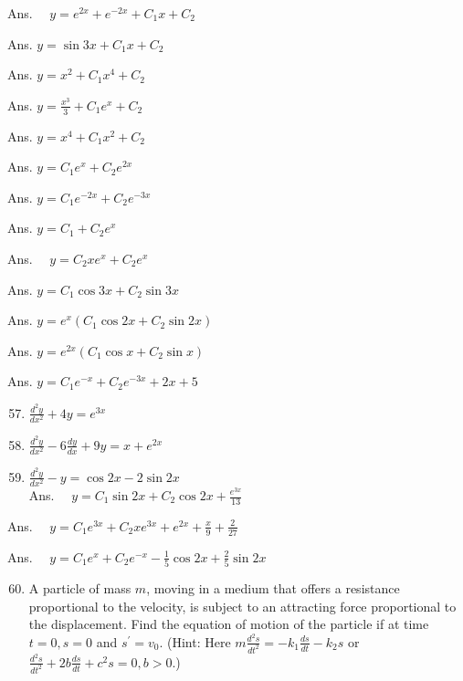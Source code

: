 \documentclass[10pt]{article}
\begin{document}
Ans. $\quad y=e^{2 x}+e^{-2 x}+C_{1} x+C_{2}$

Ans. $y=\sin 3 x+C_{1} x+C_{2}$

Ans. $y=x^{2}+C_{1} x^{4}+C_{2}$

Ans. $y=\frac{x^{3}}{3}+C_{1} e^{x}+C_{2}$

Ans. $y=x^{4}+C_{1} x^{2}+C_{2}$

Ans. $y=C_{1} e^{x}+C_{2} e^{2 x}$

Ans. $y=C_{1} e^{-2 x}+C_{2} e^{-3 x}$

Ans. $y=C_{1}+C_{2} e^{x}$

Ans. $\quad y=C_{2} x e^{x}+C_{2} e^{x}$

Ans. $y=C_{1} \cos 3 x+C_{2} \sin 3 x$

Ans. $y=e^{x}\left(C_{1} \cos 2 x+C_{2} \sin 2 x\right)$

Ans. $y=e^{2 x}\left(C_{1} \cos x+C_{2} \sin x\right)$

Ans. $y=C_{1} e^{-x}+C_{2} e^{-3 x}+2 x+5$

\begin{enumerate}
  \setcounter{enumi}{56}
  \item $\frac{d^{2} y}{d x^{2}}+4 y=e^{3 x}$

  \item $\frac{d^{2} y}{d x^{2}}-6 \frac{d y}{d x}+9 y=x+e^{2 x}$

  \item $\frac{d^{2} y}{d x^{2}}-y=\cos 2 x-2 \sin 2 x$\\
Ans. $\quad y=C_{1} \sin 2 x+C_{2} \cos 2 x+\frac{e^{3 x}}{13}$

\end{enumerate}

Ans. $\quad y=C_{1} e^{3 x}+C_{2} x e^{3 x}+e^{2 x}+\frac{x}{9}+\frac{2}{27}$

Ans. $\quad y=C_{1} e^{x}+C_{2} e^{-x}-\frac{1}{5} \cos 2 x+\frac{2}{5} \sin 2 x$

\begin{enumerate}
  \setcounter{enumi}{59}
  \item A particle of mass $m$, moving in a medium that offers a resistance proportional to the velocity, is subject to an attracting force proportional to the displacement. Find the equation of motion of the particle if at time $t=0, s=0$ and $s^{\prime}=v_{0}$. (Hint: Here $m \frac{d^{2} s}{d t^{2}}=-k_{1} \frac{d s}{d t}-k_{2} s$ or $\frac{d^{2} s}{d t^{2}}+2 b \frac{d s}{d t}+c^{2} s=0, b>0$.)
\end{enumerate}
\end{document}

